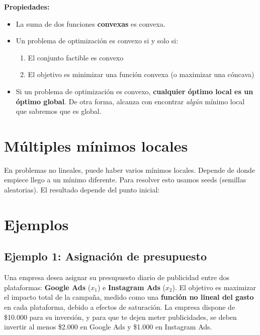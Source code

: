 \documentclass[12pt]{article}
\begin{document}
\textbf{Propiedades:}
\begin{itemize}
    \item La suma de dos funciones \textbf{convexas} es convexa.
    \item Un problema de optimización es convexo si y solo si:
    \begin{enumerate}
        \item El conjunto factible es convexo
        \item El objetivo es minimizar una función convexa (o maximizar una cóncava)
    \end{enumerate}
    \item Si un problema de optimización es convexo, \textbf{cualquier óptimo local es un óptimo global}. De otra forma, alcanza con encontrar \textit{algún} mínimo local que sabremos que es global.
\end{itemize}

\section{Múltiples mínimos locales}

En problemas no lineales, puede haber varios mínimos locales. Depende de donde empiece llego a un mínimo diferente. Para resolver esto usamos seeds (semillas aleatorias). El resultado depende del punto inicial:

\begin{center}
\end{center}

\section{Ejemplos}

\subsection{Ejemplo 1: Asignación de presupuesto}

Una empresa desea asignar su presupuesto diario de publicidad entre dos plataformas: \textbf{Google Ads} ($x_1$) e \textbf{Instagram Ads} ($x_2$). El objetivo es maximizar el impacto total de la campaña, medido como una \textbf{función no lineal del gasto} en cada plataforma, debido a efectos de saturación. La empresa dispone de \$10.000 para su inversión, y para que te dejen meter publicidades, se deben invertir al menos \$2.000 en Google Ads y \$1.000 en Instagram Ads.
\end{document}
